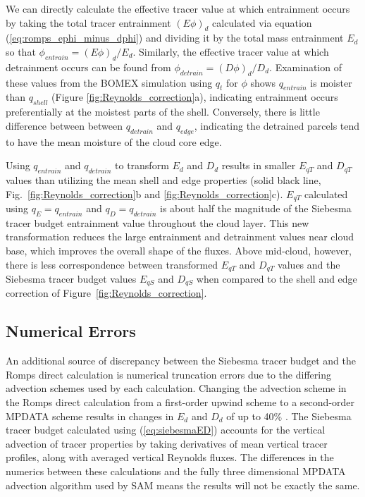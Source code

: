 \documentclass[12pt]{article}
\begin{document}
We can directly calculate the effective tracer value at which entrainment 
occurs by taking the total tracer entrainment $(E\phi)_d$ calculated via 
equation (\ref{eq:romps_ephi_minus_dphi}) and dividing it by the total mass
entrainment $E_d$ so that $\phi_{entrain} = (E\phi)_d / E_d$.  Similarly, 
the effective tracer value at which detrainment occurs can be found from  
$\phi_{detrain} = (D\phi)_d / D_d$.  Examination of these values from the 
BOMEX simulation using $q_t$ for $\phi$ shows $q_{entrain}$ is moister than 
$q_{shell}$ (Figure \ref{fig:Reynolds_correction}a), indicating entrainment
occurs preferentially at the moistest parts of the shell.  Conversely, 
there is little difference between between $q_{detrain}$ and $q_{edge}$,
indicating the detrained parcels tend to have the mean moisture of the cloud 
core edge.

Using $q_{entrain}$ and $q_{detrain}$ to transform $E_d$ and $D_d$
results in smaller $E_{q T}$ and $D_{q T}$ values than utilizing the
mean shell and edge properties (solid black line,
Fig.~\ref{fig:Reynolds_correction}b and
\ref{fig:Reynolds_correction}c).  $E_{q T}$ calculated using $q_E =
q_{entrain}$ and $q_D = q_{detrain}$ is about half the magnitude of
the Siebesma tracer budget entrainment value throughout the cloud
layer.  This new transformation reduces the large entrainment and
detrainment values near cloud base, which improves the overall shape
of the fluxes. Above mid-cloud, however, there is less correspondence 
between transformed $E_{q T}$ and $D_{q T}$ values and the Siebesma
tracer budget values $E_{q S}$ and $D_{q S}$ when compared to the 
shell and edge correction of Figure~\ref{fig:Reynolds_correction}.


\subsection{Numerical Errors}

An additional source of discrepancy between the Siebesma tracer budget 
and the Romps direct calculation is numerical truncation errors due to 
the differing advection schemes used by each calculation.  Changing the 
advection scheme in the Romps direct calculation from a first-order 
upwind scheme to a second-order MPDATA scheme results in changes in 
$E_d$ and $D_d$ of up to 40\% \citep{Dawe2011}.  The Siebesma tracer 
budget calculated using (\ref{eq:siebesmaED}) accounts for the 
vertical advection of tracer properties by taking derivatives of 
mean vertical tracer profiles, along with averaged vertical Reynolds 
fluxes.  The differences in the numerics between these calculations and 
the fully three dimensional MPDATA advection algorithm used by SAM 
means the results will not be exactly the same.
\end{document}
